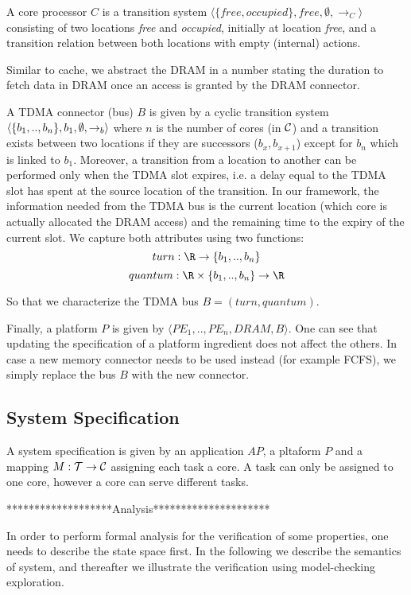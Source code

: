 A core processor $C$ is a transition system $\langle \{free, occupied\}, free, \emptyset, \rightarrow_C\rangle$ consisting of two locations \textit{free} and \textit{occupied}, initially at location \textit{free}, and a transition relation between both locations with empty (internal) actions.
   
Similar to cache, we abstract the DRAM in a number stating the duration to fetch data in DRAM once an access is granted by the DRAM connector. 

A TDMA connector (bus) $B$ is given by a cyclic transition system $\langle \{b_1, .., b_n\},\\ b_1, \emptyset, \rightarrow_b\rangle$ where $n$ is the number of cores (in ${\cal C}$) and a transition exists between two locations if they are successors ($b_x, b_{x+1}$) except for $b_n$ which is linked to $b_1$. Moreover, a transition from a location to another can be performed only when the TDMA slot expires, i.e. a delay equal to the TDMA slot has spent at the source location of the transition. In our framework, the information needed from the TDMA bus is the current location (which core is actually allocated the DRAM access) and the remaining time to the expiry of the current slot. We capture both attributes using two functions:
\[ turn: \R \rightarrow \{b_1, .., b_n\}\] 
\[ quantum: \R \times \{b_1, .., b_n\} \rightarrow \R \]

So that we characterize the TDMA bus $B=(turn, quantum)$.


Finally, a platform $P$ is given by $\langle PE_1, .., PE_n, DRAM, B\rangle$. One can see that updating the specification of a platform ingredient does not affect the others. In case a new memory connector needs to be used instead (for example FCFS), we simply replace the bus $B$ with the new connector. 

\subsection{System Specification}
A system specification is given by an application $AP$, a pltaform $P$ and a mapping $M:{\cal T} \rightarrow {\cal C}$ assigning each task a core. A task can only be assigned to one core, however a core can serve different tasks.



*******************Analysis*********************

In order to perform formal analysis for the verification of some properties, one needs to describe the state space first.
In the following we describe the semantics of system, and thereafter we illustrate the verification using model-checking exploration.
